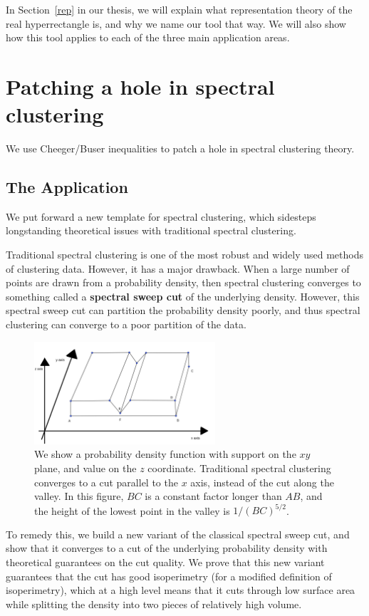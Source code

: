   In Section~\ref{rep} in our thesis, we will explain what
  representation theory of the real hyperrectangle is, and why we name
  our tool that way. We will also show how this tool applies to each of
  the three main application areas.

\section{Patching a hole in spectral clustering}
We use Cheeger/Buser inequalities to patch a hole in spectral
clustering theory.
\subsection{The Application}
We put forward a new template for spectral clustering, which sidesteps
longstanding theoretical issues with traditional spectral clustering.

Traditional spectral clustering is one of the most robust and widely
used methods of clustering data. However, it has a major drawback. When a large number of points are drawn from a probability
density, then spectral clustering converges to something called a
\textbf{spectral sweep cut} of the underlying density.  However, this
spectral sweep cut can partition the probability density poorly, and
thus spectral clustering can converge to a poor partition of the data.

\begin{figure}[htbp]
\centering
\includegraphics[width=0.6\textwidth]{images/counterexample.png}
\caption{
  We show a probability density function with support on the $xy$ plane,
  and value on the $z$ coordinate.  Traditional spectral clustering converges to a cut
  parallel to the $x$ axis, instead of the cut along the valley.
    In this figure,
  $BC$ is a constant
  factor longer than $AB$, and the height of the lowest point in the
  valley is
  $1/(BC)^{5/2}$. 
 }
\label{fig:spec}
\end{figure}

To remedy this, we build a new variant of the classical spectral sweep
cut, and show that it converges to a cut of the underlying probability
density with theoretical guarantees on the cut quality. We prove that
this new variant guarantees that the cut has good isoperimetry (for a
    modified definition of isoperimetry), which at a high level means
that it cuts through low surface area while splitting the density into
two pieces of relatively high volume.

